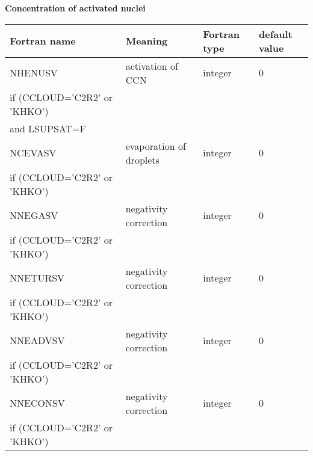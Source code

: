 \textbf{Concentration of activated nuclei}
\begin{longtable} {|p{}|p{}|>{\centering}p{}|p{}<{\centering}|}
\hline
Fortran name & Meaning & Fortran type & default value \\
\hline \hline
\endhead
NHENUSV & activation of CCN & integer & 0 \\ \nopagebreak
if (CCLOUD='C2R2' or 'KHKO') &&&\\ \nopagebreak
and LSUPSAT=F &&&\\\hline
NCEVASV & evaporation of droplets & integer & 0 \\ \nopagebreak
if (CCLOUD='C2R2' or 'KHKO') &&&\\\hline
NNEGASV   & negativity correction & integer  &  0 \\ \nopagebreak
if (CCLOUD='C2R2' or 'KHKO') &&&\\\hline
NNETURSV  &negativity correction   & integer  &  0 \\ \nopagebreak
if (CCLOUD='C2R2' or 'KHKO') &&&\\\hline
NNEADVSV  & negativity correction  & integer  &  0 \\ \nopagebreak
if (CCLOUD='C2R2' or 'KHKO') &&&\\\hline
NNECONSV  &negativity correction    & integer  &  0 \\ \nopagebreak
if (CCLOUD='C2R2' or 'KHKO') &&&\\\hline
\end{longtable}

